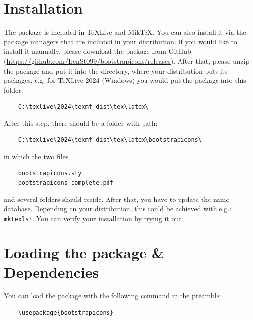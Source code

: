 \documentclass{article}
\begin{document}
\newpage

\section{Installation}

The package is included in \TeX Live and Mik\TeX. You can also install it via the package managers that are included in your distribution.
If you would like to install it manually, please download the package from GitHub (\href{https://github.com/BenSt099/bootstrapicons/releases}{\textcolor{blue-700}{https://github.com/BenSt099/bootstrapicons/releases}}).
After that, please unzip the package and put it into the directory, where your distribution puts its packages, e.g. for \TeX Live 2024 (Windows) you would put the package into this folder:

\begin{verbatim}
    C:\texlive\2024\texmf-dist\tex\latex\
\end{verbatim}\vspace{2mm}

\noindent After this step, there should be a folder with path: 

\begin{verbatim}
    C:\texlive\2024\texmf-dist\tex\latex\bootstrapicons\
\end{verbatim}\vspace{2mm}

\noindent in which the two files 

\begin{verbatim}
    bootstrapicons.sty
    bootstrapicons_complete.pdf
\end{verbatim} 
and several folders should reside. After that, you have to update the name database.
Depending on your distribution, this could be achieved with e.g.: \texttt{mktexlsr}.
You can verify your installation by trying it out.

\section{Loading the package \& Dependencies}

You can load the package with the following command in the preamble:

\vspace{5mm}
\begin{tcolorbox}[colback=gray-200]
    \vspace{3mm}
    \begin{verbatim}
    \usepackage{bootstrapicons}
    \end{verbatim}    
\end{tcolorbox}\vspace{5mm}
\end{document}
